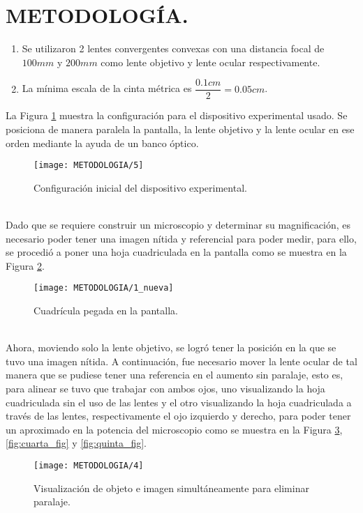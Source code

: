 \documentclass[10pt,a4paper]{article}
\begin{document}

\section{METODOLOGÍA.} %
\begin{enumerate}
	\item Se utilizaron 2 lentes convergentes convexas con una distancia focal de $100mm$ y $200mm$ como lente objetivo y lente ocular respectivamente.
	\item La mínima escala de la cinta métrica es $\dfrac{0.1cm}{2}=0.05cm$.
\end{enumerate}
La Figura \ref{fig:primer_fig} muestra la configuración para el dispositivo experimental usado. Se posiciona de manera paralela la pantalla, la lente objetivo y la lente ocular en ese orden mediante la ayuda de un banco óptico. \\[2mm]
\begin{figure}[ht]
	\centering
	\texttt{[image: METODOLOGIA/5]}
	\caption{Configuración inicial del dispositivo experimental.}
	\label{fig:primer_fig}
\end{figure}\\
Dado que se requiere construir un microscopio y determinar su magnificación, es necesario poder tener una imagen nítida y referencial para poder medir, para ello, se procedió a poner una hoja cuadriculada en la pantalla como se muestra en la Figura \ref{fig:segunda_fig}. \\[2mm]
\begin{figure}[ht]
	\centering
	\texttt{[image: METODOLOGIA/1\_nueva]}
	\caption{Cuadrícula pegada en la pantalla.}
	\label{fig:segunda_fig}
\end{figure}\\
Ahora, moviendo solo la lente objetivo, se logró tener la posición en la que se tuvo una imagen nítida. A continuación, fue necesario mover la lente ocular de tal manera que se pudiese tener una referencia en el aumento sin paralaje, esto es, para alinear se tuvo que trabajar con ambos ojos, uno visualizando la hoja cuadriculada sin el uso de las lentes y el otro visualizando la hoja cuadriculada a través de las lentes, respectivamente el ojo izquierdo y derecho, para poder tener un aproximado en la potencia del microscopio como se muestra en la Figura \ref{fig:tercer_fig}, \ref{fig:cuarta_fig} y \ref{fig:quinta_fig}. \\[2mm]
\begin{figure}[ht]
	\centering
	\texttt{[image: METODOLOGIA/4]}
	\caption{Visualización de objeto e imagen simultáneamente para eliminar paralaje.}
	\label{fig:tercer_fig}
\end{figure}\\
\end{document}
